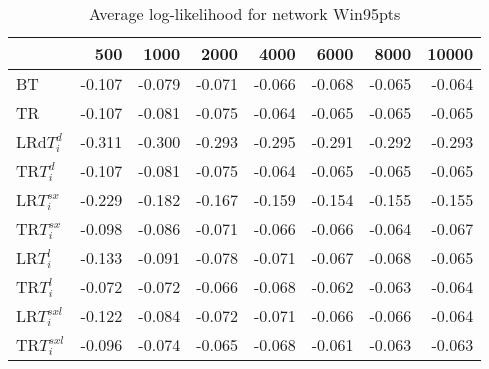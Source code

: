 \begin{table}
 \begin{center}
 \begin{tabular}{lrrrrrrr}
& 500 &  1000 & 2000 & 4000 & 6000& 8000&  10000\\\hline
BT & -0.107 & -0.079 & -0.071 & -0.066 & -0.068 & -0.065 & -0.064\\\hline
TR & -0.107 & -0.081 & -0.075 & -0.064 & -0.065 & -0.065 & -0.065\\\hline
LRd$T_i^d$ & -0.311 & -0.300 & -0.293 & -0.295 & -0.291 & -0.292 & -0.293\\\hline
TR$T_i^d$ & -0.107 & -0.081 & -0.075 & -0.064 & -0.065 & -0.065 & -0.065\\\hline
LR$T_i^{sx}$ & -0.229 & -0.182 & -0.167 & -0.159 & -0.154 & -0.155 & -0.155\\\hline
TR$T_i^{sx}$ & -0.098 & -0.086 & -0.071 & -0.066 & -0.066 & -0.064 & -0.067\\\hline
LR$T_i^l$ & -0.133 & -0.091 & -0.078 & -0.071 & -0.067 & -0.068 & -0.065\\\hline
TR$T_i^l$ & -0.072 & -0.072 & -0.066 & -0.068 & -0.062 & -0.063 & -0.064\\\hline
LR$T_i^{sxl}$ & -0.122 & -0.084 & -0.072 & -0.071 & -0.066 & -0.066 & -0.064\\\hline
TR$T_i^{sxl}$ & -0.096 & -0.074 & -0.065 & -0.068 & -0.061 & -0.063 & -0.063\\\hline
\end{tabular}
\end{center}
\caption{Average log-likelihood for network Win95pts }
\label{Win95ptsll}
\end{table}


